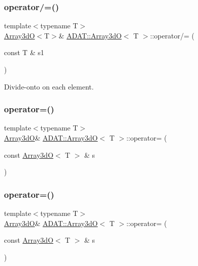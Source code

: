 \subsubsection{\texorpdfstring{operator/=()}{operator/=()}\hspace{0.1cm}{\footnotesize\ttfamily [4/4]}}
{\footnotesize\ttfamily template$<$typename T$>$ \\
\mbox{\hyperlink{classADAT_1_1Array3dO}{Array3dO}}$<$T$>$\& \mbox{\hyperlink{classADAT_1_1Array3dO}{A\+D\+A\+T\+::\+Array3dO}}$<$ T $>$\+::operator/= (\begin{DoxyParamCaption}\item[{const T \&}]{s1 }\end{DoxyParamCaption})\hspace{0.3cm}{\ttfamily [inline]}}



Divide-\/onto on each element. 

\mbox{\label{classADAT_1_1Array3dO_a11d4d9d221d7e6598675307926a38f4f}} 
\subsubsection{\texorpdfstring{operator=()}{operator=()}\hspace{0.1cm}{\footnotesize\ttfamily [1/4]}}
{\footnotesize\ttfamily template$<$typename T$>$ \\
\mbox{\hyperlink{classADAT_1_1Array3dO}{Array3dO}}\& \mbox{\hyperlink{classADAT_1_1Array3dO}{A\+D\+A\+T\+::\+Array3dO}}$<$ T $>$\+::operator= (\begin{DoxyParamCaption}\item[{const \mbox{\hyperlink{classADAT_1_1Array3dO}{Array3dO}}$<$ T $>$ \&}]{s }\end{DoxyParamCaption})\hspace{0.3cm}{\ttfamily [inline]}}

\mbox{\label{classADAT_1_1Array3dO_a11d4d9d221d7e6598675307926a38f4f}} 
\subsubsection{\texorpdfstring{operator=()}{operator=()}\hspace{0.1cm}{\footnotesize\ttfamily [2/4]}}
{\footnotesize\ttfamily template$<$typename T$>$ \\
\mbox{\hyperlink{classADAT_1_1Array3dO}{Array3dO}}\& \mbox{\hyperlink{classADAT_1_1Array3dO}{A\+D\+A\+T\+::\+Array3dO}}$<$ T $>$\+::operator= (\begin{DoxyParamCaption}\item[{const \mbox{\hyperlink{classADAT_1_1Array3dO}{Array3dO}}$<$ T $>$ \&}]{s }\end{DoxyParamCaption})\hspace{0.3cm}{\ttfamily [inline]}}

